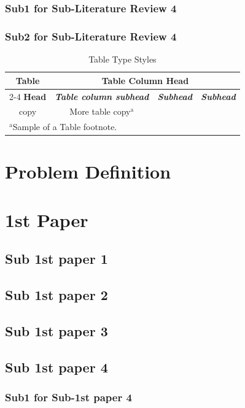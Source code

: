 \documentclass[12pt,a4paper]{report}
\begin{document}
\subsection{Sub1  for Sub-Literature Review 4}
\subsection{Sub2  for Sub-Literature Review 4}
\begin{table}[htbp]
	\caption{Table Type Styles}
	\begin{center}
		\begin{tabular}{|c|c|c|c|}
			\hline
			\textbf{Table}&\multicolumn{3}{|c|}{\textbf{Table Column Head}} \\
			\cline{2-4} 
			\textbf{Head} & \textbf{\textit{Table column subhead}}& \textbf{\textit{Subhead}}& \textbf{\textit{Subhead}} \\
			\hline
			copy& More table copy$^{\mathrm{a}}$& &  \\
			\hline
			\multicolumn{4}{l}{$^{\mathrm{a}}$Sample of a Table footnote.}
		\end{tabular}
		\label{tab1}
	\end{center}
\end{table}
\chapter{Problem Definition}
\noindent{\rule{\textwidth}{1.5pt}}
\chapter{1st Paper}
\noindent{\rule{\textwidth}{1.5pt}}
\section{Sub 1st paper 1}
\section{Sub 1st paper 2}
\section{Sub 1st paper 3}
\section{Sub 1st paper 4}
\subsection{Sub1  for Sub-1st paper 4}
\end{document}
